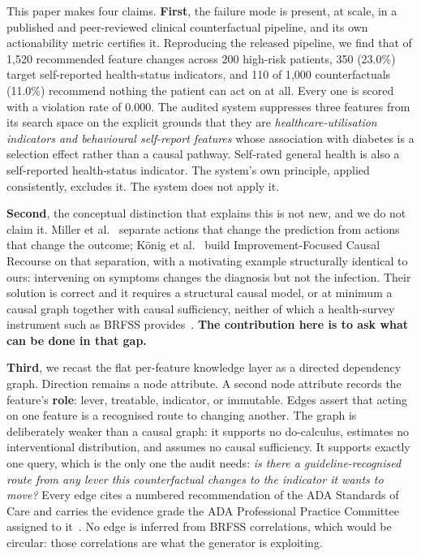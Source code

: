 \documentclass[conference]{IEEEtran}
\begin{document}
This paper makes four claims. \textbf{First}, the failure mode is present, at scale, in a published and peer-reviewed clinical counterfactual pipeline, and its own actionability metric certifies it. Reproducing the released pipeline, we find that of 1{,}520 recommended feature changes across 200 high-risk patients, 350 (23.0\%) target self-reported health-status indicators, and 110 of 1{,}000 counterfactuals (11.0\%) recommend nothing the patient can act on at all. Every one is scored with a violation rate of 0.000. The audited system suppresses three features from its search space on the explicit grounds that they are \emph{healthcare-utilisation indicators and behavioural self-report features} whose association with diabetes is a selection effect rather than a causal pathway. Self-rated general health is also a self-reported health-status indicator. The system's own principle, applied consistently, excludes it. The system does not apply it.

\textbf{Second}, the conceptual distinction that explains this is not new, and we do not claim it. Miller et al.~\cite{miller2020} separate actions that change the prediction from actions that change the outcome; K\"onig et al.~\cite{konig2023} build Improvement-Focused Causal Recourse on that separation, with a motivating example structurally identical to ours: intervening on symptoms changes the diagnosis but not the infection. Their solution is correct and it requires a structural causal model, or at minimum a causal graph together with causal sufficiency, neither of which a health-survey instrument such as BRFSS provides~\cite{konig2023,thieu2026}. \textbf{The contribution here is to ask what can be done in that gap.}

\textbf{Third}, we recast the flat per-feature knowledge layer as a directed dependency graph. Direction remains a node attribute. A second node attribute records the feature's \textbf{role}: lever, treatable, indicator, or immutable. Edges assert that acting on one feature is a recognised route to changing another. The graph is deliberately weaker than a causal graph: it supports no do-calculus, estimates no interventional distribution, and assumes no causal sufficiency. It supports exactly one query, which is the only one the audit needs: \emph{is there a guideline-recognised route from any lever this counterfactual changes to the indicator it wants to move?} Every edge cites a numbered recommendation of the ADA Standards of Care and carries the evidence grade the ADA Professional Practice Committee assigned to it~\cite{ada2026s5,ada2026s8,ada2026s10,ada2026int}. No edge is inferred from BRFSS correlations, which would be circular: those correlations are what the generator is exploiting.
\end{document}
